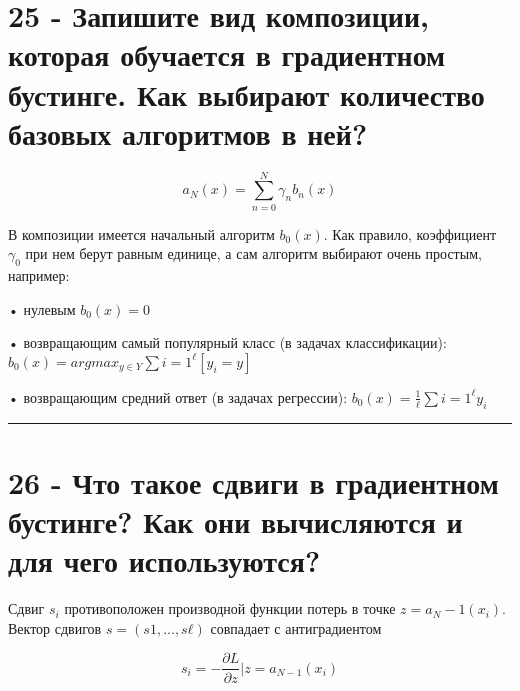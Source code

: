 \documentclass[11pt]{article}
\begin{document}
    \section{25 - Запишите вид композиции, которая обучается в градиентном
бустинге. Как выбирают количество базовых алгоритмов в
ней?}\label{ux437ux430ux43fux438ux448ux438ux442ux435-ux432ux438ux434-ux43aux43eux43cux43fux43eux437ux438ux446ux438ux438-ux43aux43eux442ux43eux440ux430ux44f-ux43eux431ux443ux447ux430ux435ux442ux441ux44f-ux432-ux433ux440ux430ux434ux438ux435ux43dux442ux43dux43eux43c-ux431ux443ux441ux442ux438ux43dux433ux435.-ux43aux430ux43a-ux432ux44bux431ux438ux440ux430ux44eux442-ux43aux43eux43bux438ux447ux435ux441ux442ux432ux43e-ux431ux430ux437ux43eux432ux44bux445-ux430ux43bux433ux43eux440ux438ux442ux43cux43eux432-ux432-ux43dux435ux439}

\[a_N(x) = \sum_{n=0}^Nγ_nb_n(x)\]

В композиции имеется начальный алгоритм \(b_0(x)\). Как правило,
коэффициент \(γ_0\) при нем берут равным единице, а сам алгоритм
выбирают очень простым, например:

• нулевым \(b_0(x) = 0\)

• возвращающим самый популярный класс (в задачах классификации):
\(b_0(x) = arg max_{y∈Y} \sum{i=1}^ℓ[y_i = y]\)

• возвращающим средний ответ (в задачах регрессии):
\(b_0(x) = \frac{1}{ℓ} \sum{i=1}^ℓy_i\)

    \begin{center}\rule{0.5\linewidth}{\linethickness}\end{center}

    \section{26 - Что такое сдвиги в градиентном бустинге? Как они
вычисляются и для чего
используются?}\label{ux447ux442ux43e-ux442ux430ux43aux43eux435-ux441ux434ux432ux438ux433ux438-ux432-ux433ux440ux430ux434ux438ux435ux43dux442ux43dux43eux43c-ux431ux443ux441ux442ux438ux43dux433ux435-ux43aux430ux43a-ux43eux43dux438-ux432ux44bux447ux438ux441ux43bux44fux44eux442ux441ux44f-ux438-ux434ux43bux44f-ux447ux435ux433ux43e-ux438ux441ux43fux43eux43bux44cux437ux443ux44eux442ux441ux44f}

Сдвиг \(s_i\) противоположен производной функции потерь в точке
\(z = a_N−1(x_i)\). Вектор сдвигов \(s = (s1,...,sℓ)\) совпадает с
антиградиентом

\[s_i = −\frac{∂L}{∂z}|z=a_{N−1}(x_i)\]
\end{document}
